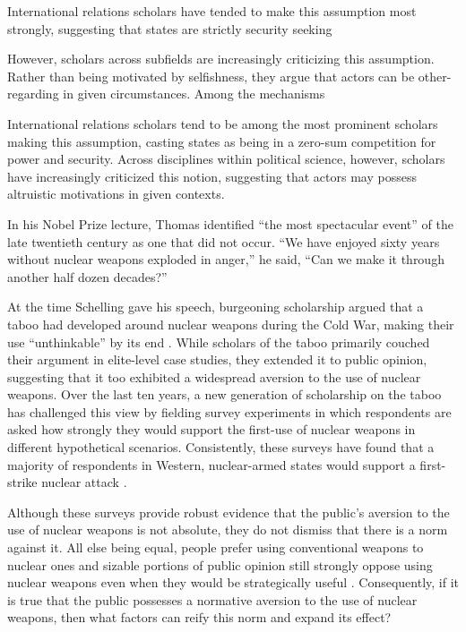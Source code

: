 \documentclass[12pt]{article}
\begin{document}
International relations scholars have tended to make this assumption most strongly, suggesting that states are strictly security seeking


However, scholars across subfields are increasingly criticizing this assumption. Rather than being motivated by selfishness, they argue that actors can be other-regarding in given circumstances. Among the mechanisms

International relations scholars tend to be among the most prominent scholars making this assumption, casting states as being in a zero-sum competition for power and security. Across disciplines within political science, however, scholars have increasingly criticized this notion, suggesting that actors may possess altruistic motivations in given contexts.

In his Nobel Prize lecture, Thomas \citet{schelling_astonishing_2006} identified “the most spectacular event” of the late twentieth century as one that did not occur. “We have enjoyed sixty years without nuclear weapons exploded in anger,” he said, “Can we make it through another half dozen decades?”

At the time Schelling gave his speech, burgeoning scholarship argued that a taboo had developed around nuclear weapons during the Cold War, making their use “unthinkable” by its end \citep{tannenwald_stigmatizing_2005}. While scholars of the taboo primarily couched their argument in elite-level case studies, they extended it to public opinion, suggesting that it too exhibited a widespread aversion to the use of nuclear weapons. Over the last ten years, a new generation of scholarship on the taboo has challenged this view by fielding survey experiments in which respondents are asked how strongly they would support the first-use of nuclear weapons in different hypothetical scenarios. Consistently, these surveys have found that a majority of respondents in Western, nuclear-armed states would support a first-strike nuclear attack \citep{sagan_revisiting_2017, haworth_what_2019,allison_under_2022, dill_kettles_2022}.

Although these surveys provide robust evidence that the public's aversion to the use of nuclear weapons is not absolute, they do not dismiss that there is a norm against it. All else being equal, people prefer using conventional weapons to nuclear ones and sizable portions of public opinion still strongly oppose using nuclear weapons even when they would be strategically useful \citep{press_atomic_2013}. Consequently, if it is true that the public possesses a normative aversion to the use of nuclear weapons, then what factors can reify this norm and expand its effect?
\end{document}

